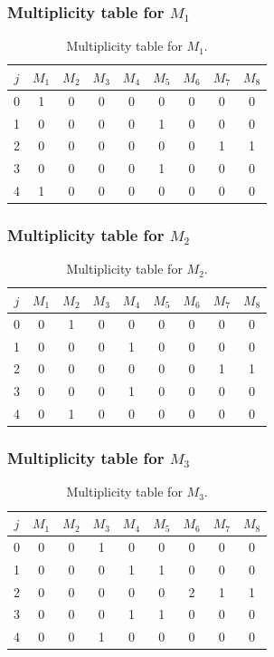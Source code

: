 \subsubsection{Multiplicity table for $M_{1}$}

\begin{table}[ht]
\centering
\begin{tabular}{c|cccccccc}
\hline
$j$ & $M_{1}$ & $M_{2}$ & $M_{3}$ & $M_{4}$ & $M_{5}$ & $M_{6}$ & $M_{7}$ & $M_{8}$ \\
\hline
0 & 1 & 0 & 0 & 0 & 0 & 0 & 0 & 0 \\
1 & 0 & 0 & 0 & 0 & 1 & 0 & 0 & 0 \\
2 & 0 & 0 & 0 & 0 & 0 & 0 & 1 & 1 \\
3 & 0 & 0 & 0 & 0 & 1 & 0 & 0 & 0 \\
4 & 1 & 0 & 0 & 0 & 0 & 0 & 0 & 0 \\
\hline
\end{tabular}
\caption{Multiplicity table for $M_{1}$.}
\end{table}

\subsubsection{Multiplicity table for $M_{2}$}

\begin{table}[ht]
\centering
\begin{tabular}{c|cccccccc}
\hline
$j$ & $M_{1}$ & $M_{2}$ & $M_{3}$ & $M_{4}$ & $M_{5}$ & $M_{6}$ & $M_{7}$ & $M_{8}$ \\
\hline
0 & 0 & 1 & 0 & 0 & 0 & 0 & 0 & 0 \\
1 & 0 & 0 & 0 & 1 & 0 & 0 & 0 & 0 \\
2 & 0 & 0 & 0 & 0 & 0 & 0 & 1 & 1 \\
3 & 0 & 0 & 0 & 1 & 0 & 0 & 0 & 0 \\
4 & 0 & 1 & 0 & 0 & 0 & 0 & 0 & 0 \\
\hline
\end{tabular}
\caption{Multiplicity table for $M_{2}$.}
\end{table}

\subsubsection{Multiplicity table for $M_{3}$}

\begin{table}[ht]
\centering
\begin{tabular}{c|cccccccc}
\hline
$j$ & $M_{1}$ & $M_{2}$ & $M_{3}$ & $M_{4}$ & $M_{5}$ & $M_{6}$ & $M_{7}$ & $M_{8}$ \\
\hline
0 & 0 & 0 & 1 & 0 & 0 & 0 & 0 & 0 \\
1 & 0 & 0 & 0 & 1 & 1 & 0 & 0 & 0 \\
2 & 0 & 0 & 0 & 0 & 0 & 2 & 1 & 1 \\
3 & 0 & 0 & 0 & 1 & 1 & 0 & 0 & 0 \\
4 & 0 & 0 & 1 & 0 & 0 & 0 & 0 & 0 \\
\hline
\end{tabular}
\caption{Multiplicity table for $M_{3}$.}
\end{table}

